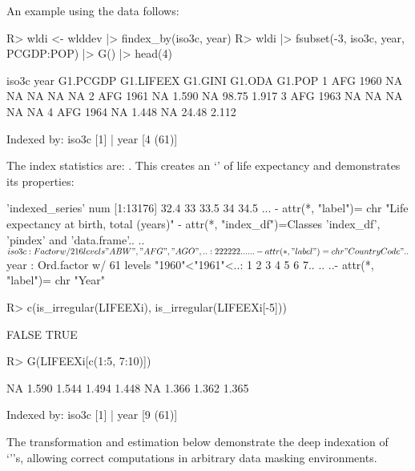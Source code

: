 \documentclass[nojss]{jss} %
\newcommand{\class}[1]{`\code{#1}'}
\begin{document}
%
An example using the  data follows:
\begin{Schunk}
\begin{Sinput}
R> wldi <- wlddev |> findex_by(iso3c, year)
R> wldi |> fsubset(-3, iso3c, year, PCGDP:POP) |> G() |> head(4)
\end{Sinput}
\begin{Soutput}
  iso3c year G1.PCGDP G1.LIFEEX G1.GINI G1.ODA G1.POP
1   AFG 1960       NA        NA      NA     NA     NA
2   AFG 1961       NA     1.590      NA  98.75  1.917
3   AFG 1963       NA        NA      NA     NA     NA
4   AFG 1964       NA     1.448      NA  24.48  2.112

Indexed by:  iso3c [1] | year [4 (61)] 
\end{Soutput}
\end{Schunk}
The index statistics are: . This creates an \class{indexes\_series} of life expectancy and demonstrates its properties:
\begin{Schunk}
\begin{Soutput}
 'indexed_series' num [1:13176] 32.4 33 33.5 34 34.5 ...
 - attr(*, "label")= chr "Life expectancy at birth, total (years)"
 - attr(*, "index_df")=Classes 'index_df', 'pindex' and 'data.frame'..
  ..$ iso3c: Factor w/ 216 levels "ABW","AFG","AGO",..: 2 2 2 2 2 2 ..
  .. ..- attr(*, "label")= chr "Country Code"
  ..$ year : Ord.factor w/ 61 levels "1960"<"1961"<..: 1 2 3 4 5 6 7..
  .. ..- attr(*, "label")= chr "Year"
\end{Soutput}
\begin{Sinput}
R> c(is_irregular(LIFEEXi), is_irregular(LIFEEXi[-5]))
\end{Sinput}
\begin{Soutput}
[1] FALSE  TRUE
\end{Soutput}
\begin{Sinput}
R> G(LIFEEXi[c(1:5, 7:10)])
\end{Sinput}
\begin{Soutput}
[1]    NA 1.590 1.544 1.494 1.448    NA 1.366 1.362 1.365

Indexed by:  iso3c [1] | year [9 (61)] 
\end{Soutput}
\end{Schunk}
The transformation and estimation below demonstrate the deep indexation of \\ \class{indexed\_frame}'s, allowing correct computations in arbitrary data masking environments.
\end{document}
